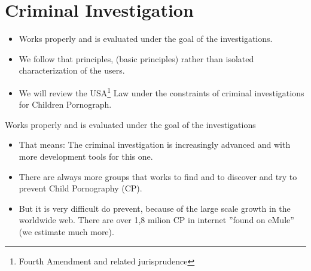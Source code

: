\documentclass[notes]{beamer}
\begin{document}
\section{Criminal Investigation}
\begin{frame}

\begin{itemize} 
    \item[\checkmark] Works properly and is evaluated under the goal of the investigations.
    
    \item[\checkmark] We follow that principles, (basic principles) rather than isolated characterization of the users.
    
    \item[\checkmark] We will review the USA\footnote{Fourth Amendment and related jurisprudence} Law under the constraints of criminal investigations for Children Pornograph.
\end{itemize}

\end{frame}

\begin{frame}
\begin{block}{Works properly and is evaluated under the goal of the investigations}

\begin{itemize}

\item[\checkmark]That  means: The criminal investigation is increasingly advanced and with more development tools for this one. 

\item[\checkmark]There are always more groups that works to find and to discover and try to prevent Child Pornography (CP).

\item[\checkmark]But it is very difficult do prevent, because of the large scale growth in the worldwide web. There are over 1,8 milion CP in internet ''found on eMule'' (we estimate much more).

\end{itemize}

\end{block}

\end{frame}
\end{document}
